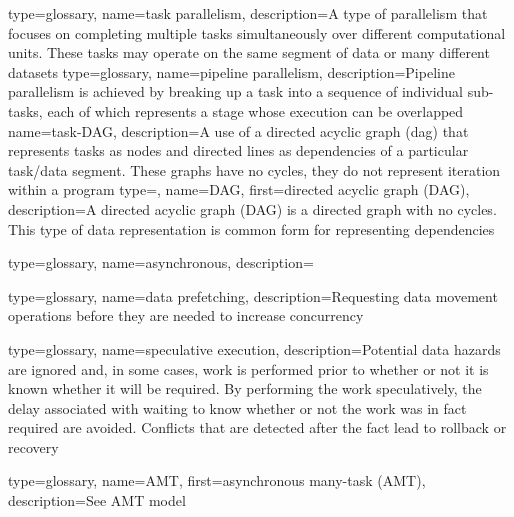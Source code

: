 {
  type=glossary,
  name={task parallelism},
  description={A type of parallelism that focuses on completing multiple tasks simultaneously over different computational units. These tasks may operate on the same segment of data or many different datasets}
}
{
  type=glossary,
  name={pipeline parallelism},
  description={Pipeline parallelism is achieved by breaking up a task into a sequence of
individual sub-tasks, each of which represents a stage whose execution can be
  overlapped}
}
{
  name={task-DAG},
  description={A use of a directed acyclic graph (\gls{dag}) that represents tasks as nodes and directed lines as dependencies of a particular task/data segment. These graphs have no cycles, they do not represent iteration within a program}
}
{
  type=\acronymtype,
  name={DAG},
  first={directed acyclic graph (DAG)},
  description={A directed acyclic graph (DAG) is a directed graph with no cycles. This type of data representation is common form for representing dependencies}
}

{
  type=glossary,
  name=asynchronous,
  description={}
}

{
  type=glossary,
  name={data prefetching},
  description={Requesting data movement operations before they are needed to
    increase \gls{concurrency}}
}

{
  type=glossary,
  name={speculative execution},
  description={Potential data hazards are ignored and, in some cases, work is performed prior to
    whether or not it is known whether it will be required.  By performing the
      work speculatively, the delay associated with waiting to know whether or not the work
      was in fact required are avoided. Conflicts that are detected after the
      fact lead to rollback or recovery}
}

{
  type=glossary,
  name={AMT},
  first={asynchronous many-task (AMT)},
  description={See \gls{AMT model}}
}

